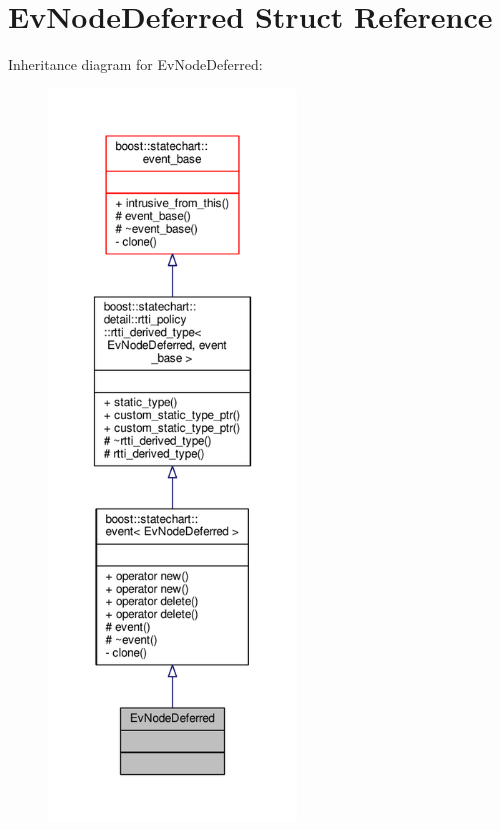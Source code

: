 \hypertarget{struct_ev_node_deferred}{}\section{Ev\+Node\+Deferred Struct Reference}
\label{struct_ev_node_deferred}


Inheritance diagram for Ev\+Node\+Deferred\+:
\nopagebreak
\begin{figure}[H]
\begin{center}
\leavevmode
\includegraphics[height=550pt]{struct_ev_node_deferred__inherit__graph}
\end{center}
\end{figure}


